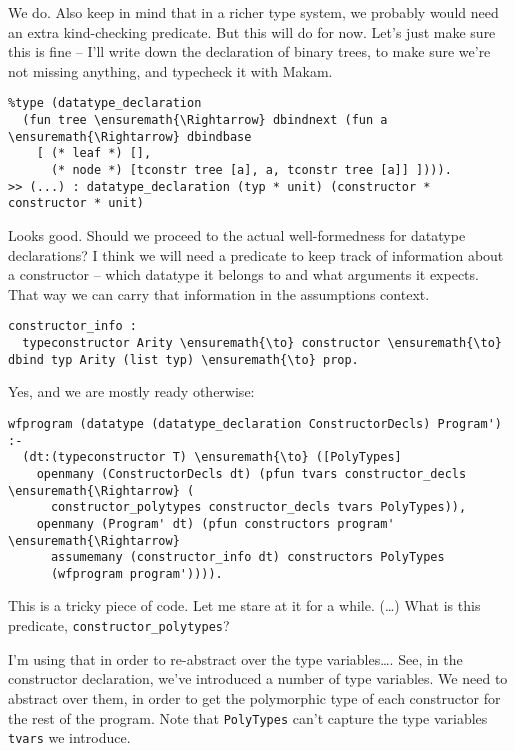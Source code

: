 \heroADVISOR{} We do. Also keep in mind that in a richer type system, we
probably would need an extra kind-checking predicate. But this will do
for now. Let's just make sure this is fine -- I'll write down the
declaration of binary trees, to make sure we're not missing anything,
and typecheck it with Makam.

\begin{verbatim}
%type (datatype_declaration
  (fun tree \ensuremath{\Rightarrow} dbindnext (fun a \ensuremath{\Rightarrow} dbindbase
    [ (* leaf *) [],
      (* node *) [tconstr tree [a], a, tconstr tree [a]] ]))).
>> (...) : datatype_declaration (typ * unit) (constructor * constructor * unit)
\end{verbatim}

\heroSTUDENT{} Looks good. Should we proceed to the actual well-formedness for
datatype declarations? I think we will need a predicate to keep track of
information about a constructor -- which datatype it belongs to and what
arguments it expects. That way we can carry that information in the
assumptions context.

\begin{verbatim}
constructor_info :
  typeconstructor Arity \ensuremath{\to} constructor \ensuremath{\to} dbind typ Arity (list typ) \ensuremath{\to} prop.
\end{verbatim}

\heroADVISOR{} Yes, and we are mostly ready otherwise:

\begin{verbatim}
wfprogram (datatype (datatype_declaration ConstructorDecls) Program') :-
  (dt:(typeconstructor T) \ensuremath{\to} ([PolyTypes]
    openmany (ConstructorDecls dt) (pfun tvars constructor_decls \ensuremath{\Rightarrow} (
      constructor_polytypes constructor_decls tvars PolyTypes)),
    openmany (Program' dt) (pfun constructors program' \ensuremath{\Rightarrow}
      assumemany (constructor_info dt) constructors PolyTypes
      (wfprogram program')))).
\end{verbatim}

\heroSTUDENT{} This is a tricky piece of code. Let me stare at it for a while.
(\ldots{}) What is this predicate, \texttt{constructor\_polytypes}?

\heroADVISOR{} I'm using that in order to re-abstract over the type
variables\ldots{}. See, in the constructor declaration, we've introduced
a number of type variables. We need to abstract over them, in order to
get the polymorphic type of each constructor for the rest of the
program. Note that \texttt{PolyTypes} can't capture the type variables
\texttt{tvars} we introduce.

